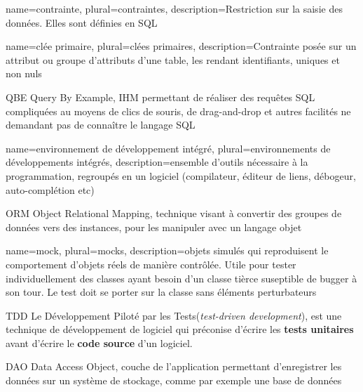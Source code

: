         {name={contrainte},
        plural={contraintes},
        description={Restriction sur la saisie des données. Elles sont définies en SQL}}

        {name={clée primaire},
        plural={clées primaires},
        description={Contrainte posée sur un attribut ou groupe d'attributs d'une table, les rendant identifiants, uniques et non nuls}}

        {QBE}
        {Query By Example, IHM permettant de réaliser des requêtes SQL compliquées au moyens de clics de souris, de drag-and-drop et autres
        facilités ne demandant pas de connaître le langage SQL}
		
		{name={environnement de développement intégré},
		plural={environnements de développements intégrés},
		description={ensemble d'outils nécessaire à la programmation, regroupés en un logiciel (compilateur, éditeur de liens, débogeur, auto-complétion etc)}}

        {ORM}
        {Object Relational Mapping, technique visant à convertir des groupes de données vers des instances, pour les manipuler avec un langage objet}

		{
		name={mock},
		plural={mocks},
		description={objets simulés qui reproduisent le comportement d'objets réels de manière contrôlée. Utile pour tester individuellement des classes ayant besoin d'un classe tièrce suseptible de bugger à son tour.
		Le test doit se porter sur la classe sans éléments perturbateurs}
		}

	{TDD}
	{Le Développement Piloté par les Tests(\textit{test-driven development}), 
	est une technique de développement de logiciel qui préconise d'écrire les \textbf{tests unitaires} avant d'écrire le \textbf{code source} d'un logiciel.}

        {DAO}
        {Data Access Object, couche de l'application permettant d'enregistrer les données sur un système de stockage, comme par exemple une base de données}
